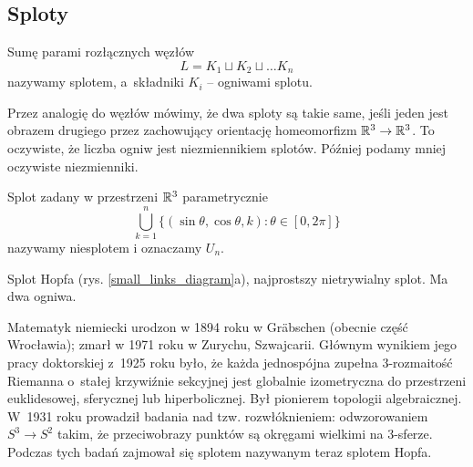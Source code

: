 
\subsection{Sploty}
\begin{definition}
%
    Sumę parami rozłącznych węzłów
    \begin{equation}
        L = K_1 \sqcup K_2 \sqcup \ldots K_n
    \end{equation}
    nazywamy splotem, a~składniki $K_i$ -- ogniwami splotu.
\end{definition}

Przez analogię do węzłów mówimy, że dwa sploty są takie same, jeśli jeden jest obrazem drugiego przez zachowujący orientację homeomorfizm $\mathbb R^3 \to \mathbb R^3$.
To oczywiste, że liczba ogniw jest niezmiennikiem splotów.
Później podamy mniej oczywiste niezmienniki.

\begin{example}[niesplot]
%
    Splot zadany w przestrzeni $\mathbb R^3$ parametrycznie
    \begin{equation}
        \bigcup_{k=1}^n \{(\sin \theta, \cos \theta, k) : \theta \in [0, 2\pi]\}
    \end{equation}
    nazywamy niesplotem i oznaczamy $U_n$.
\end{example}
    
\begin{example}
%
%
    Splot Hopfa (rys. \ref{small_links_diagram}a), najprostszy nietrywialny splot. Ma dwa ogniwa.
\end{example}

\begin{remark}
    Matematyk niemiecki urodzon w 1894 roku w Gräbschen (obecnie część Wrocławia); zmarł w 1971 roku w Zurychu, Szwajcarii.
    Głównym wynikiem jego pracy doktorskiej z~1925 roku było, że każda jednospójna zupełna 3-rozmaitość Riemanna o~stałej krzywiźnie sekcyjnej jest globalnie izometryczna do przestrzeni euklidesowej, sferycznej lub hiperbolicznej.
    Był pionierem topologii algebraicznej.
    W~1931 roku prowadził badania nad tzw. rozwłóknieniem: odwzorowaniem $S^3 \to S^2$ takim, że przeciwobrazy punktów są okręgami wielkimi na 3-sferze.
    Podczas tych badań zajmował się splotem nazywanym teraz splotem Hopfa.
\end{remark}

